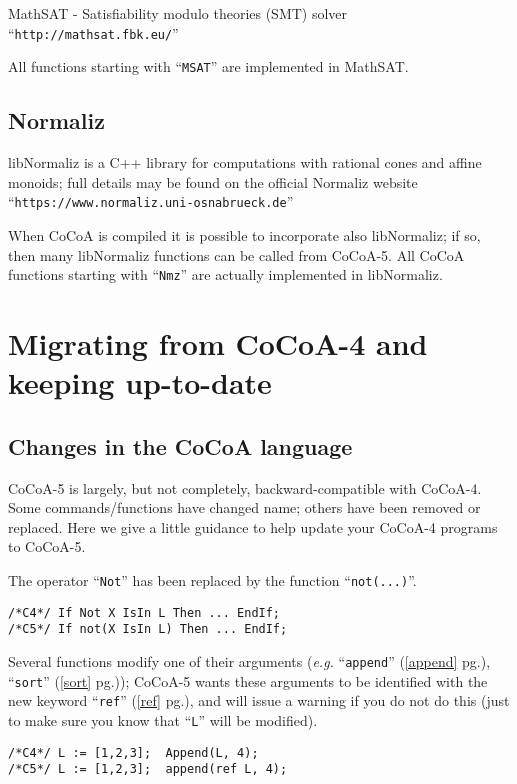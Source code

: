 \documentclass[a4paper]{mybook}
\begin{document}
        
MathSAT - Satisfiability modulo theories (SMT) solver
``\verb&http://mathsat.fbk.eu/&''
\par 
All functions starting with ``\verb&MSAT&'' are implemented in MathSAT.


\section{Normaliz}
\label{Normaliz}

        
libNormaliz is a C++ library for computations with rational cones and affine
monoids; full details may be found on the official Normaliz website
``\verb&https://www.normaliz.uni-osnabrueck.de&''
\par 
When CoCoA is compiled it is possible to incorporate also libNormaliz;
if so, then many libNormaliz functions can be called from CoCoA-5.
All CoCoA functions starting with ``\verb&Nmz&'' are actually implemented
in libNormaliz.


\chapter{Migrating from CoCoA-4 and keeping up-to-date}
\label{Migrating from CoCoA-4 and keeping up-to-date}

      

\section{Changes in the CoCoA language}
\label{Changes in the CoCoA language}

        
CoCoA-5 is largely, but not completely, backward-compatible with CoCoA-4.
Some commands/functions have changed name; others have been removed or
replaced.  Here we give a little guidance to help update your CoCoA-4
programs to CoCoA-5.
\par 
The operator ``\verb&Not&'' has been replaced by the function ``\verb&not(...)&''.
\begin{Verbatim}[label=example, rulecolor=\color{PineGreen}, frame=single]
/*C4*/ If Not X IsIn L Then ... EndIf;
/*C5*/ If not(X IsIn L) Then ... EndIf;
\end{Verbatim}

Several functions modify one of their arguments (\textit{e.g.} ``\verb&append&'' (\ref{append} pg.\pageref{append}),
``\verb&sort&'' (\ref{sort} pg.\pageref{sort})); CoCoA-5 wants these arguments to be identified with the new
keyword ``\verb&ref&'' (\ref{ref} pg.\pageref{ref}), and will issue a warning if you do not do this
(just to make sure you know that ``\verb&L&'' will be modified).
\begin{Verbatim}[label=example, rulecolor=\color{PineGreen}, frame=single]
/*C4*/ L := [1,2,3];  Append(L, 4);
/*C5*/ L := [1,2,3];  append(ref L, 4);
\end{Verbatim}
\end{document}
